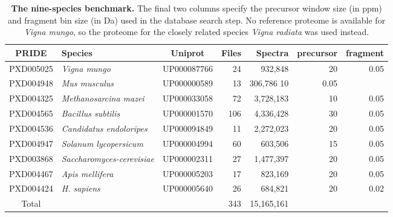 \documentclass{article}
\begin{document}
\begin{table}
\scriptsize
\centering
\begin{tabular}{clcrrrr}
\hline
PRIDE & Species & Uniprot & Files & Spectra & precursor & fragment \\
\hline
PXD005025 & \textit{Vigna mungo} & UP000087766 & 24 & 932,848 & 20 & 0.05 \\
PXD004948 & \textit{Mus musculus} & UP000000589 & 13 & 306,786 10 & 0.05 \\
PXD004325 & \textit{Methanosarcina mazei} & UP000033058  & 72 & 3,728,183 & 10 & 0.05 \\
PXD004565 & \textit{Bacillus subtilis} & UP000001570 & 106 & 4,336,428 & 30 & 0.05 \\
PXD004536 & \textit{Candidatus endoloripes} & UP000094849 & 11 & 2,272,023 & 20 & 0.05 \\
PXD004947 & \textit{Solanum lycopersicum} & UP000004994 & 60 & 603,506 & 15 & 0.05 \\
PXD003868 & \textit{Saccharomyces-cerevisiae} & UP000002311 & 27 & 1,477,397 & 20 & 0.05 \\
PXD004467 & \textit{Apis mellifera} & UP000005203 & 17 & 823,169 & 20 & 0.05 \\
PXD004424 & \textit{H. sapiens} & UP000005640 & 26 & 684,821 & 20 & 0.02 \\
\hline
Total & & & 343 & 15,165,161 \\
\end{tabular}
\caption{{\bf The nine-species benchmark.}
The final two columns specify the precursor window size (in ppm) and fragment bin size (in Da) used in the database search step.
No reference proteome is available for \textit{Vigna mungo}, so the proteome for the closely related species \textit{Vigna radiata} was used instead.
}
\label{tab:benchmark}
\end{table}
\end{document}
